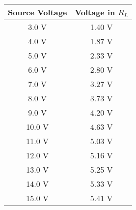 \begin{multicols}{2}
\begin{tasks}
\begin{center}
\begin{tabular}[.5cm]{ c c }
\toprule
Source Voltage & Voltage in $R_{L}$ \\
\midrule
3.0 V & 1.40 V \\
\cmidrule{1-2}
4.0 V & 1.87 V \\
\cmidrule{1-2}
5.0 V & 2.33 V \\
\cmidrule{1-2}
6.0 V & 2.80 V \\
\cmidrule{1-2}
7.0 V & 3.27 V \\
\cmidrule{1-2}
8.0 V & 3.73 V \\
\cmidrule{1-2}
9.0 V &  4.20 V \\
\cmidrule{1-2}
10.0 V & 4.63 V \\
\cmidrule{1-2}
11.0 V & 5.03 V \\
\cmidrule{1-2}
12.0 V & 5.16 V \\
\cmidrule{1-2}
13.0 V & 5.25 V \\
\cmidrule{1-2}
14.0 V & 5.33 V \\
\cmidrule{1-2}
15.0 V & 5.41 V \\
\bottomrule
\end{tabular}
\end{center}
\end{tasks}
\end{multicols}

\pagebreak

